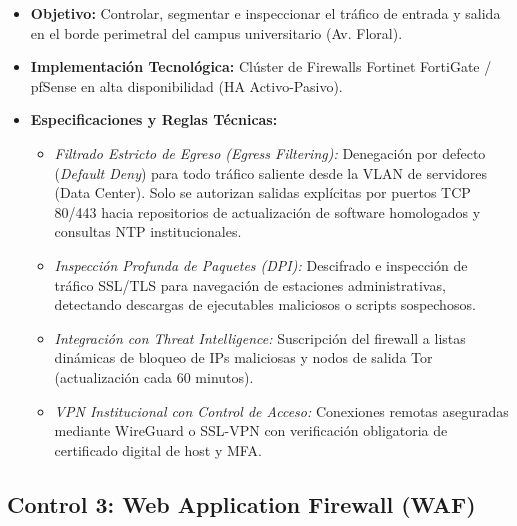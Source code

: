 \begin{itemize}
    \item \textbf{Objetivo:} Controlar, segmentar e inspeccionar el tráfico de entrada y salida en el borde perimetral del campus universitario (Av. Floral).
    \item \textbf{Implementación Tecnológica:} Clúster de Firewalls Fortinet FortiGate / pfSense en alta disponibilidad (HA Activo-Pasivo).
    \item \textbf{Especificaciones y Reglas Técnicas:}
    \begin{itemize}
        \item \textit{Filtrado Estricto de Egreso (Egress Filtering):} Denegación por defecto (\textit{Default Deny}) para todo tráfico saliente desde la VLAN de servidores (Data Center). Solo se autorizan salidas explícitas por puertos TCP 80/443 hacia repositorios de actualización de software homologados y consultas NTP institucionales.
        \item \textit{Inspección Profunda de Paquetes (DPI):} Descifrado e inspección de tráfico SSL/TLS para navegación de estaciones administrativas, detectando descargas de ejecutables maliciosos o scripts sospechosos.
        \item \textit{Integración con Threat Intelligence:} Suscripción del firewall a listas dinámicas de bloqueo de IPs maliciosas y nodos de salida Tor (actualización cada 60 minutos).
        \item \textit{VPN Institucional con Control de Acceso:} Conexiones remotas aseguradas mediante WireGuard o SSL-VPN con verificación obligatoria de certificado digital de host y MFA.
    \end{itemize}
\end{itemize}

\subsection{Control 3: Web Application Firewall (WAF)}

